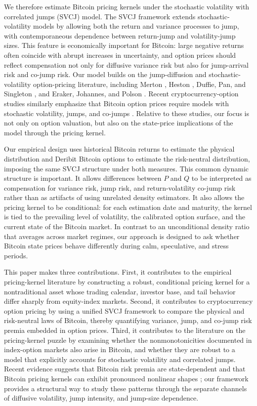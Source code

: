 We therefore estimate Bitcoin pricing kernels under the stochastic volatility with correlated jumps (SVCJ) model. The SVCJ framework extends stochastic-volatility models by allowing both the return and variance processes to jump, with contemporaneous dependence between return-jump and volatility-jump sizes. This feature is economically important for Bitcoin: large negative returns often coincide with abrupt increases in uncertainty, and option prices should reflect compensation not only for diffusive variance risk but also for jump-arrival risk and co-jump risk. Our model builds on the jump-diffusion and stochastic-volatility option-pricing literature, including Merton \citep{Merton1976}, Heston \citep{Heston1993}, Duffie, Pan, and Singleton \citep{DuffiePanSingleton2000}, and Eraker, Johannes, and Polson \citep{ErakerJohannesPolson2003}. Recent cryptocurrency-option studies similarly emphasize that Bitcoin option prices require models with stochastic volatility, jumps, and co-jumps \citep{HouWangChenHaerdle2020,MaticPackhamHaerdle2021}. Relative to these studies, our focus is not only on option valuation, but also on the state-price implications of the model through the pricing kernel.

Our empirical design uses historical Bitcoin returns to estimate the physical distribution and Deribit Bitcoin options to estimate the risk-neutral distribution, imposing the same SVCJ structure under both measures. This common dynamic structure is important. It allows differences between $P$ and $Q$ to be interpreted as compensation for variance risk, jump risk, and return-volatility co-jump risk rather than as artifacts of using unrelated density estimators. It also allows the pricing kernel to be conditional: for each estimation date and maturity, the kernel is tied to the prevailing level of volatility, the calibrated option surface, and the current state of the Bitcoin market. In contrast to an unconditional density ratio that averages across market regimes, our approach is designed to ask whether Bitcoin state prices behave differently during calm, speculative, and stress periods.

This paper makes three contributions. First, it contributes to the empirical pricing-kernel literature by constructing a robust, conditional pricing kernel for a nontraditional asset whose trading calendar, investor base, and tail behavior differ sharply from equity-index markets. Second, it contributes to cryptocurrency option pricing by using a unified SVCJ framework to compare the physical and risk-neutral laws of Bitcoin, thereby quantifying variance, jump, and co-jump risk premia embedded in option prices. Third, it contributes to the literature on the pricing-kernel puzzle by examining whether the nonmonotonicities documented in index-option markets also arise in Bitcoin, and whether they are robust to a model that explicitly accounts for stochastic volatility and correlated jumps. Recent evidence suggests that Bitcoin risk premia are state-dependent and that Bitcoin pricing kernels can exhibit pronounced nonlinear shapes \citep{AlmeidaGrithMiftachovWang2024}; our framework provides a structural way to study these patterns through the separate channels of diffusive volatility, jump intensity, and jump-size dependence.

